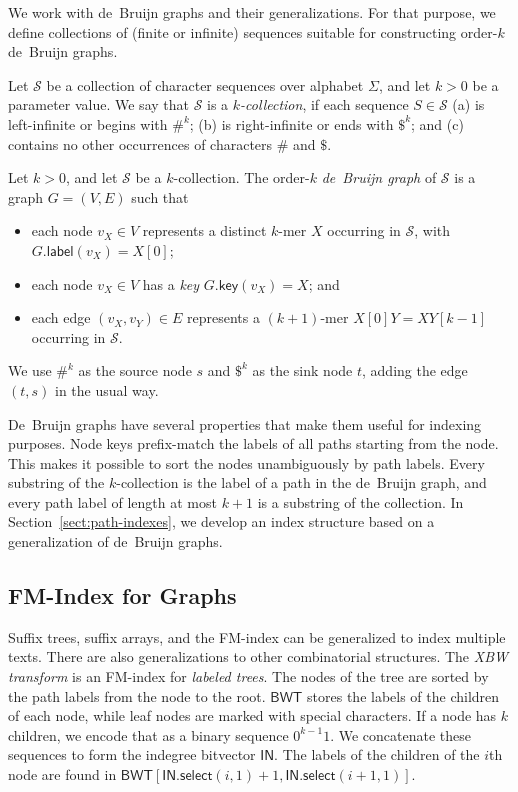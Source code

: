 \documentclass[twoside,leqno,twocolumn]{article}
\newcommand{\select}{\ensuremath{\mathsf{select}}}
\newcommand{\glabel}{\ensuremath{\mathsf{label}}}
\newcommand{\gkey}{\ensuremath{\mathsf{key}}}
\newcommand{\kmer}[1]{$#1$\nobreakdash-mer}
\newcommand{\kcollection}[1]{$#1$\nobreakdash-collection}
\newcommand{\orderk}[1]{order\nobreakdash-$#1$}
\newcommand{\FMindex}{FM\nobreakdash-index}
\newcommand{\BWT}{\ensuremath{\mathsf{BWT}}}
\newcommand{\bvIN}{\ensuremath{\mathsf{IN}}}
\begin{document}
We work with de~Bruijn graphs and their generalizations. For that purpose, we define collections of (finite or infinite) sequences suitable for constructing \orderk{k} de~Bruijn graphs.

\begin{Definition}[\kcollection{k}]
Let $\mathcal{S}$ be a collection of character sequences over alphabet $\Sigma$, and let $k > 0$ be a parameter value. We say that $\mathcal{S}$ is a \emph{\kcollection{k}}, if each sequence $S \in \mathcal{S}$
(a) is left-infinite or begins with $\#^{k}$;
(b) is right-infinite or ends with $\$^{k}$; and
(c) contains no other occurrences of characters $\#$ and $\$$.
\end{Definition}

\begin{Definition}
Let $k > 0$, and let $\mathcal{S}$ be a \kcollection{k}. The \orderk{k} \emph{de~Bruijn graph} of $\mathcal{S}$ is a graph $G = (V, E)$ such that
\begin{itemize}
\item each node $v_{X} \in V$ represents a distinct \kmer{k} $X$ occurring in $\mathcal{S}$, with $G.\glabel(v_{X}) = X[0]$;
\item each node $v_{X} \in V$ has a \emph{key} $G.\gkey(v_{X}) = X$; and
\item each edge $(v_{X}, v_{Y}) \in E$ represents a \kmer{(k+1)} $X[0]Y = XY[k-1]$ occurring in $\mathcal{S}$.
\end{itemize}
We use $\#^{k}$ as the source node $s$ and $\$^{k}$ as the sink node $t$, adding the edge $(t, s)$ in the usual way.
\end{Definition}

De~Bruijn graphs have several properties that make them useful for indexing purposes. Node keys prefix-match the labels of all paths starting from the node. This makes it possible to sort the nodes unambiguously by path labels. Every substring of the \kcollection{k} is the label of a path in the de~Bruijn graph, and every path label of length at most $k+1$ is a substring of the collection. In Section~\ref{sect:path-indexes}, we develop an index structure based on a generalization of de~Bruijn graphs.

\subsection{FM-Index for Graphs}

Suffix trees, suffix arrays, and the \FMindex{} can be generalized to index multiple texts. There are also generalizations to other combinatorial structures. The \emph{XBW transform} \cite{Ferragina2009b} is an \FMindex{} for \emph{labeled trees}. The nodes of the tree are sorted by the path labels from the node to the root. $\BWT$ stores the labels of the children of each node, while leaf nodes are marked with special characters. If a node has $k$ children, we encode that as a binary sequence $0^{k-1} 1$. We concatenate these sequences to form the indegree bitvector $\bvIN$. The labels of the children of the $i$th node are found in $\BWT[\bvIN.\select(i, 1) + 1, \bvIN.\select(i + 1, 1)]$.
\end{document}
